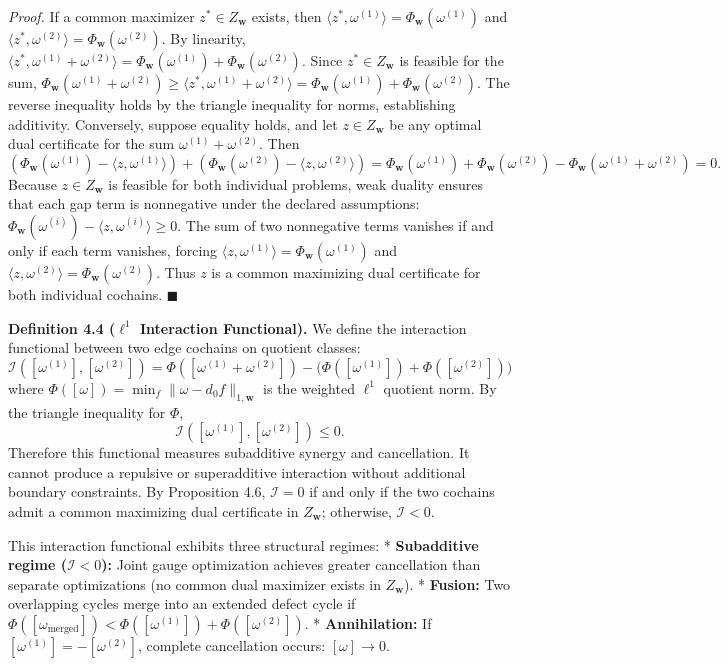 \documentclass[
]{article}
\begin{document}
\emph{Proof.} If a common maximizer \(z^* \in Z_{\mathbf{w}}\) exists, then \(\langle z^*, \omega^{(1)} \rangle = \Phi_{\mathbf{w}}(\omega^{(1)})\) and \(\langle z^*, \omega^{(2)} \rangle = \Phi_{\mathbf{w}}(\omega^{(2)})\). By linearity, \(\langle z^*, \omega^{(1)} + \omega^{(2)} \rangle = \Phi_{\mathbf{w}}(\omega^{(1)}) + \Phi_{\mathbf{w}}(\omega^{(2)})\). Since \(z^* \in Z_{\mathbf{w}}\) is feasible for the sum, \(\Phi_{\mathbf{w}}(\omega^{(1)} + \omega^{(2)}) \ge \langle z^*, \omega^{(1)} + \omega^{(2)} \rangle = \Phi_{\mathbf{w}}(\omega^{(1)}) + \Phi_{\mathbf{w}}(\omega^{(2)})\). The reverse inequality holds by the triangle inequality for norms, establishing additivity.
Conversely, suppose equality holds, and let \(z \in Z_{\mathbf{w}}\) be any optimal dual certificate for the sum \(\omega^{(1)} + \omega^{(2)}\). Then
\[(\Phi_{\mathbf{w}}(\omega^{(1)}) - \langle z, \omega^{(1)} \rangle) + (\Phi_{\mathbf{w}}(\omega^{(2)}) - \langle z, \omega^{(2)} \rangle) = \Phi_{\mathbf{w}}(\omega^{(1)}) + \Phi_{\mathbf{w}}(\omega^{(2)}) - \Phi_{\mathbf{w}}(\omega^{(1)} + \omega^{(2)}) = 0.\]
Because \(z \in Z_{\mathbf{w}}\) is feasible for both individual problems, weak duality ensures that each gap term is nonnegative under the declared assumptions: \(\Phi_{\mathbf{w}}(\omega^{(i)}) - \langle z, \omega^{(i)} \rangle \ge 0\). The sum of two nonnegative terms vanishes if and only if each term vanishes, forcing \(\langle z, \omega^{(1)} \rangle = \Phi_{\mathbf{w}}(\omega^{(1)})\) and \(\langle z, \omega^{(2)} \rangle = \Phi_{\mathbf{w}}(\omega^{(2)})\). Thus \(z\) is a common maximizing dual certificate for both individual cochains. \(\blacksquare\)

\textbf{Definition 4.4 (\(\ell^1\) Interaction Functional).} We define the interaction functional between two edge cochains on quotient classes:
\[ \mathcal{I}([\omega^{(1)}], [\omega^{(2)}]) = \Phi([\omega^{(1)} + \omega^{(2)}]) - \big(\Phi([\omega^{(1)}]) + \Phi([\omega^{(2)}])\big) \]
where \(\Phi([\omega]) = \min_f \|\omega - d_0 f\|_{1,\mathbf{w}}\) is the weighted \(\ell^1\) quotient norm. By the triangle inequality for \(\Phi\),
\[
\mathcal{I}([\omega^{(1)}],[\omega^{(2)}]) \le 0.
\]
Therefore this functional measures subadditive synergy and cancellation. It cannot produce a repulsive or superadditive interaction without additional boundary constraints. By Proposition 4.6, \(\mathcal{I} = 0\) if and only if the two cochains admit a common maximizing dual certificate in \(Z_{\mathbf{w}}\); otherwise, \(\mathcal{I} < 0\).

This interaction functional exhibits three structural regimes:
* \textbf{Subadditive regime (\(\mathcal{I} < 0\)):} Joint gauge optimization achieves greater cancellation than separate optimizations (no common dual maximizer exists in \(Z_{\mathbf{w}}\)).
* \textbf{Fusion:} Two overlapping cycles merge into an extended defect cycle if \(\Phi([\omega_{\text{merged}}]) < \Phi([\omega^{(1)}]) + \Phi([\omega^{(2)}])\).
* \textbf{Annihilation:} If \([\omega^{(1)}] = -[\omega^{(2)}]\), complete cancellation occurs: \([\omega] \to 0\).
\end{document}

